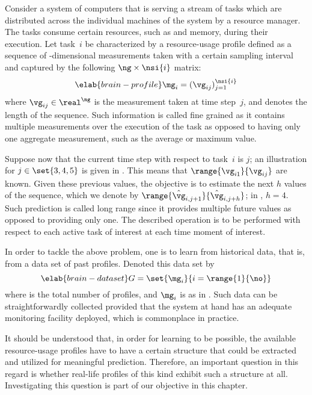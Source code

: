 Consider a system of computers that is serving a stream of tasks which are
distributed across the individual machines of the system by a resource manager.
The tasks consume certain resources, such as  and memory, during their
execution. Let task~$i$ be characterized by a resource-usage profile defined as
a sequence of \ng-dimensional measurements taken with a certain sampling
interval and captured by the following $\ng \times \nsi{i}$ matrix:
\begin{equation} \elab{brain-profile}
  \mg_i = (\vg_{ij})_{j = 1}^\nsi{i}
\end{equation}
where $\vg_{ij} \in \real^\ng$ is the measurement taken at time step~$j$, and
 denotes the length of the sequence. Such information is called fine
grained as it contains multiple measurements over the execution of the task as
opposed to having only one aggregate measurement, such as the average or maximum
value.

Suppose now that the current time step with respect to task~$i$ is $j$; an
illustration for $j \in \set{3, 4, 5}$ is given in .
This means that $\range{\vg_{i1}}{\vg_{ij}}$ are known. Given these previous
values, the objective is to estimate the next $h$ values of the sequence, which
we denote by $\range{\hat{\vg}_{i, j + 1}}{\hat{\vg}_{i, j + h}}$; in
, $h = 4$. Such prediction is called long range since it
provides multiple future values as opposed to providing only one. The described
operation is to be performed with respect to each active task of interest at
each time moment of interest.

In order to tackle the above problem, one is to learn from historical data, that
is, from a data set of past profiles. Denoted this data set by
\begin{equation} \elab{brain-dataset}
  G = \set{\mg_i}{i = \range{1}{\no}}
\end{equation}
where \no is the total number of profiles, and $\mg_i$ is as in
. Such data can be straightforwardly collected provided that
the system at hand has an adequate monitoring facility deployed, which is
commonplace in practice.

It should be understood that, in order for learning to be possible, the
available resource-usage profiles have to have a certain structure that could be
extracted and utilized for meaningful prediction. Therefore, an important
question in this regard is whether real-life profiles of this kind exhibit such
a structure at all. Investigating this question is part of our objective in this
chapter.
